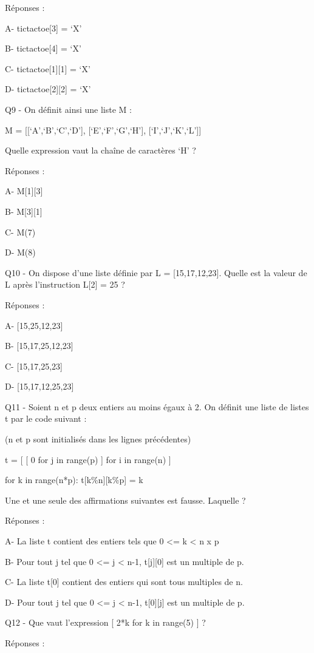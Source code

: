 \documentclass[
]{book}
\begin{document}
Réponses :

A- tictactoe{[}3{]} = `X'

B- tictactoe{[}4{]} = `X'

C- tictactoe{[}1{]}{[}1{]} = `X'

D- tictactoe{[}2{]}{[}2{]} = `X'

Q9 - On définit ainsi une liste M :

M = {[}{[}`A',`B',`C',`D'{]}, {[}`E',`F',`G',`H'{]}, {[}`I',`J',`K',`L'{]}{]}

Quelle expression vaut la chaîne de caractères `H' ?

Réponses :

A- M{[}1{]}{[}3{]}

B- M{[}3{]}{[}1{]}

C- M(7)

D- M(8)

Q10 - On dispose d'une liste définie par L = {[}15,17,12,23{]}. Quelle est la valeur de L après l'instruction L{[}2{]} = 25 ?

Réponses :

A- {[}15,25,12,23{]}

B- {[}15,17,25,12,23{]}

C- {[}15,17,25,23{]}

D- {[}15,17,12,25,23{]}

Q11 - Soient n et p deux entiers au moins égaux à 2. On définit une liste de listes t par le code suivant :

(n et p sont initialisés dans les lignes précédentes)

t = {[} {[} 0 for j in range(p) {]} for i in range(n) {]}

for k in range(n*p):
t{[}k\%n{]}{[}k\%p{]} = k

Une et une seule des affirmations suivantes est fausse. Laquelle ?

Réponses :

A- La liste t contient des entiers tels que 0 \textless= k \textless{} n x p

B- Pour tout j tel que 0 \textless= j \textless{} n-1, t{[}j{]}{[}0{]} est un multiple de p.

C- La liste t{[}0{]} contient des entiers qui sont tous multiples de n.

D- Pour tout j tel que 0 \textless= j \textless{} n-1, t{[}0{]}{[}j{]} est un multiple de p.

Q12 - Que vaut l'expression {[} 2*k for k in range(5) {]} ?

Réponses :
\end{document}
